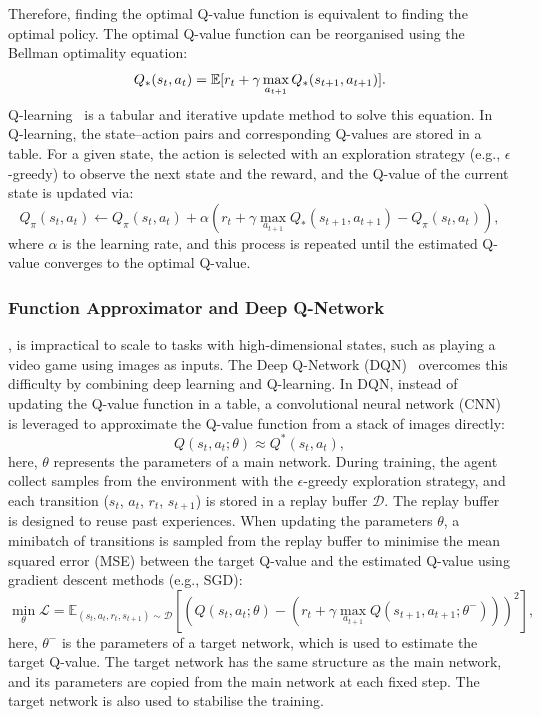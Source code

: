 Therefore, finding the optimal Q-value function is equivalent to finding the optimal policy. The optimal Q-value function can be reorganised using the Bellman optimality equation:
\begin{equation}
\centering
     Q_{*}(s_{t},a_{t}) = \mathbb{E}[r_{t} + \gamma\max_{a_{t+1}} Q_{*}(s_{t+1}, a_{t+1})].
\end{equation}
Q-learning~\cite{watkins1992q} is a tabular and iterative update method to solve this equation. In Q-learning, the state--action pairs and corresponding Q-values are stored in a table. For a given state, the action is selected with an exploration strategy (e.g., $\epsilon$-greedy) to observe the next state and the reward, and the Q-value of the current state is updated via:
\begin{equation}
    Q_{\pi}(s_{t}, a_{t}) \leftarrow Q_{\pi}(s_{t}, a_{t}) + \alpha(r_{t} + \gamma\max_{a_{t+1}}Q_{*}(s_{t+1}, a_{t+1}) - Q_{\pi}(s_{t}, a_{t})),
\end{equation}
where $\alpha$ is the learning rate, and this process is repeated until the estimated Q-value converges to the optimal Q-value.

\subsubsection{Function Approximator and Deep Q-Network}
, is impractical to scale to tasks with high-dimensional states, such as playing a video game using images as inputs. The Deep Q-Network (DQN)~\cite{mnih2015human} overcomes this difficulty by combining deep learning and Q-learning. In DQN, instead of updating the Q-value function in a table, a convolutional neural network (CNN) is leveraged to approximate the Q-value function from a stack of images directly:
\begin{equation}
    Q(s_{t},a_{t};\theta) \approx Q^{*}(s_{t},a_{t}),
\end{equation}
here, $\theta$ represents the parameters of a main network. During training, the agent collect samples from the environment with the $\epsilon$-greedy exploration strategy, and each transition ($s_{t}$, $a_{t}$, $r_{t}$, $s_{t+1}$) is stored in a replay buffer $\mathcal{D}$. The replay buffer is designed to reuse past experiences. When updating the parameters $\theta$, a minibatch of transitions is sampled from the replay buffer to minimise the mean squared error (MSE) between the target Q-value and the estimated Q-value using gradient descent methods (e.g., SGD):
\begin{equation}
    \min_{\theta}\mathcal{L} = \mathbb{E}_{(s_{t}, a_{t}, r_{t}, s_{t+1})\sim\mathcal{D}}[(Q(s_{t}, a_{t};\theta) - (r_{t} + \gamma\max_{a_{t+1}}Q(s_{t+1}, a_{t+1};\theta^{-})))^{2}],
\end{equation}
here, $\theta^{-}$ is the parameters of a target network, which is used to estimate the target Q-value. The target network has the same structure as the main network, and its parameters are copied from the main network at each fixed step. The target network is also used to stabilise the training. 

